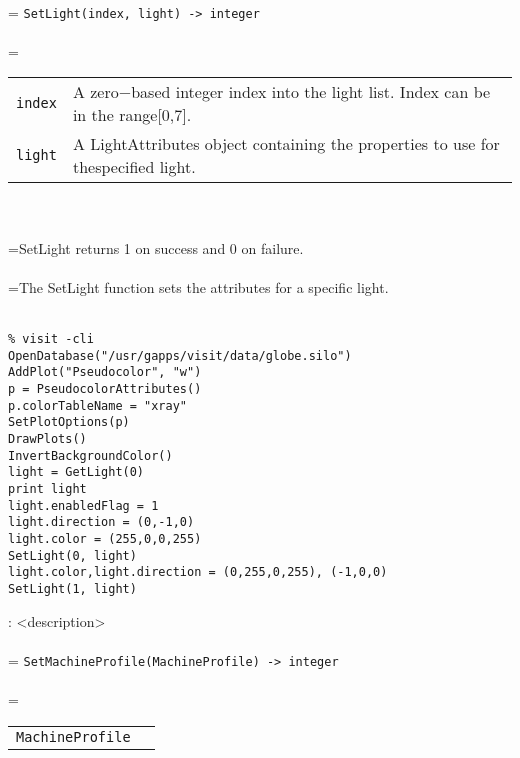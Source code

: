 \documentclass[10pt,a4paper]{report}
\begin{document}
 \\ 
\hangindent=\parindent 
\verb!SetLight(index, light) -> integer!\\ [-3mm]

 \\ 
\hangindent=\parindent 
\begin{tabular}{lp{9cm}}
\verb!index! & A zero$-$based integer index into the light list. Index can be in the range[0,7]. \\
\verb!light! & A LightAttributes object containing the properties to use for thespecified light. \\
\end{tabular} \\[-2mm]


 \\ 
\hangindent=\parindent SetLight returns 1 on success and 0 on failure. \\[-3mm] 

 \\ 
\hangindent=\parindent The SetLight function sets the attributes for a specific light.  \\[-3mm] 

\\[-6mm]
\begin{verbatim}% visit -cli
OpenDatabase("/usr/gapps/visit/data/globe.silo")
AddPlot("Pseudocolor", "w")
p = PseudocolorAttributes()
p.colorTableName = "xray"
SetPlotOptions(p)
DrawPlots()
InvertBackgroundColor()
light = GetLight(0)
print light
light.enabledFlag = 1
light.direction = (0,-1,0)
light.color = (255,0,0,255)
SetLight(0, light)
light.color,light.direction = (0,255,0,255), (-1,0,0)
SetLight(1, light)
\end{verbatim}
\newpage


{}
: <description>\\[-3mm]

 \\ 
\hangindent=\parindent 
\verb!SetMachineProfile(MachineProfile) -> integer!\\ [-3mm]

 \\ 
\hangindent=\parindent 
\begin{tabular}{ll}
\verb!MachineProfile! &  \\
\end{tabular} \\[-2mm]
\end{document}
